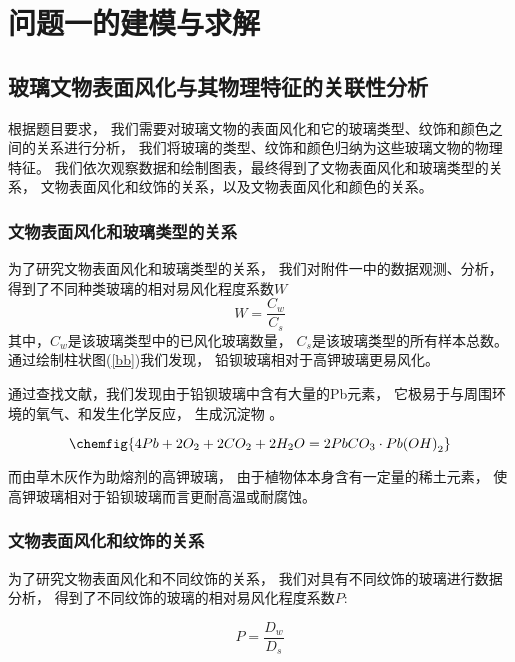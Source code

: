 \documentclass[withoutpreface,bwprint]{cumcmthesis} %
\begin{document}
\section{问题一的建模与求解}

\subsection{玻璃文物表面风化与其物理特征的关联性分析}
根据题目要求，
我们需要对玻璃文物的表面风化和它的玻璃类型、纹饰和颜色之间的关系进行分析，
我们将玻璃的类型、纹饰和颜色归纳为这些玻璃文物的物理特征。
我们依次观察数据和绘制图表，最终得到了文物表面风化和玻璃类型的关系，
文物表面风化和纹饰的关系，以及文物表面风化和颜色的关系。

\subsubsection{文物表面风化和玻璃类型的关系}

为了研究文物表面风化和玻璃类型的关系，
我们对附件一中的数据观测、分析，
得到了不同种类玻璃的相对易风化程度系数$W$
\begin{equation}
    W = \dfrac{C_w}{C_s}
\end{equation}
其中，$C_w$是该玻璃类型中的已风化玻璃数量，
$C_s$是该玻璃类型的所有样本总数。通过绘制柱状图(\ref{bb})我们发现，
铅钡玻璃相对于高钾玻璃更易风化。

通过查找文献，我们发现由于铅钡玻璃中含有大量的Pb元素，
它极易于与周围环境的氧气、和发生化学反应，
生成沉淀物 \cite{yijianzhanguoshiqibaleng}。

\begin{equation}
    \chemfig{4Pb + 2O_2 + 2CO_2 + 2H_2O = 2PbCO_3 \cdot Pb{(}OH{)}_2}
\end{equation}

而由草木灰作为助熔剂的高钾玻璃，
由于植物体本身含有一定量的稀土元素，
使高钾玻璃相对于铅钡玻璃而言更耐高温或耐腐蚀\cite{gudaibolicailiao}\cite{wedepohl2010chemical}。

\subsubsection{文物表面风化和纹饰的关系}
为了研究文物表面风化和不同纹饰的关系，
我们对具有不同纹饰的玻璃进行数据分析，
得到了不同纹饰的玻璃的相对易风化程度系数$P$:

\begin{equation}
    P = \dfrac{D_w}{D_s}
\end{equation}
\end{document}
